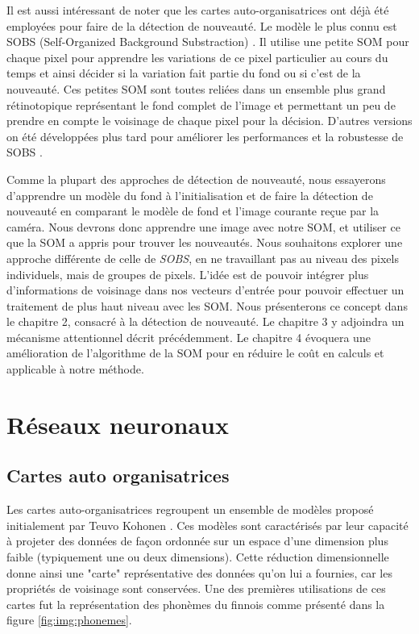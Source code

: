 	Il est aussi intéressant de noter que les cartes auto-organisatrices ont déjà été employées pour faire de la détection de nouveauté. Le modèle le plus connu est SOBS (Self-Organized Background Substraction) \cite{maddalena2008self}. Il utilise une petite SOM pour chaque pixel pour apprendre les variations de ce pixel particulier au cours du temps et ainsi décider si la variation fait partie du fond ou si c'est de la nouveauté. Ces petites SOM sont toutes reliées dans un ensemble plus grand rétinotopique représentant le fond complet de l'image et permettant un peu de prendre en compte le voisinage de chaque pixel pour la décision. D'autres versions on été développées plus tard pour améliorer les performances et la robustesse de SOBS \cite{gemignani2016robust}.

	Comme la plupart des approches de détection de nouveauté, nous essayerons d'apprendre un modèle du fond à l'initialisation et de faire la détection de nouveauté en comparant le modèle de fond et l'image courante reçue par la caméra. Nous devrons donc apprendre une image avec notre SOM, et utiliser ce que la SOM a appris pour trouver les nouveautés. Nous souhaitons explorer une approche différente de celle de \textit{SOBS}, en ne travaillant pas au niveau des pixels individuels, mais de groupes de pixels. L'idée est de pouvoir intégrer plus d'informations de voisinage dans nos vecteurs d'entrée pour pouvoir effectuer un traitement de plus haut niveau avec les SOM. Nous présenterons ce concept dans le chapitre 2, consacré à la détection de nouveauté. Le chapitre 3 y adjoindra un mécanisme attentionnel décrit précédemment. Le chapitre 4 évoquera une amélioration de l'algorithme de la SOM pour en réduire le coût en calculs et applicable à notre méthode.

\newpage
\section{Réseaux neuronaux}
\subsection{Cartes auto organisatrices}\label{sec:sota:som}

	Les cartes auto-organisatrices regroupent un ensemble de modèles proposé initialement par Teuvo Kohonen \cite{kohonen-som82}. Ces modèles sont caractérisés par leur capacité à projeter des données de façon ordonnée sur un espace d'une dimension plus faible (typiquement une ou deux dimensions). Cette réduction dimensionnelle donne ainsi une "carte" représentative des données qu'on lui a fournies, car les propriétés de voisinage sont conservées. Une des premières utilisations de ces cartes fut la représentation des phonèmes du finnois comme présenté dans la figure \ref{fig:img:phonemes}.

